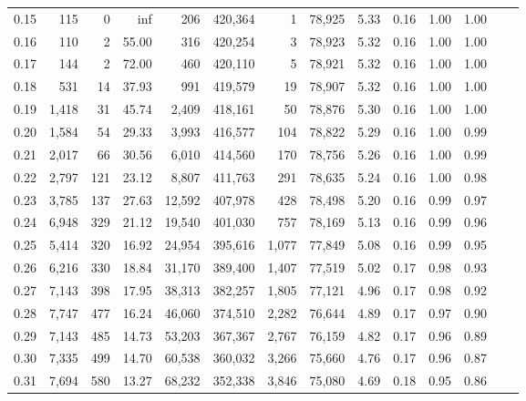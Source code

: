 \begin{tabular}{rrrrrrrrrrrrrr}
0.15 &     115 &      0 &     inf &      206 &  420,364 &       1 &  78,925 &  5.33 &  0.16 &  1.00 &      1.00 \\
0.16 &     110 &      2 &   55.00 &      316 &  420,254 &       3 &  78,923 &  5.32 &  0.16 &  1.00 &      1.00 \\
0.17 &     144 &      2 &   72.00 &      460 &  420,110 &       5 &  78,921 &  5.32 &  0.16 &  1.00 &      1.00 \\
0.18 &     531 &     14 &   37.93 &      991 &  419,579 &      19 &  78,907 &  5.32 &  0.16 &  1.00 &      1.00 \\
0.19 &   1,418 &     31 &   45.74 &    2,409 &  418,161 &      50 &  78,876 &  5.30 &  0.16 &  1.00 &      1.00 \\
0.20 &   1,584 &     54 &   29.33 &    3,993 &  416,577 &     104 &  78,822 &  5.29 &  0.16 &  1.00 &      0.99 \\
0.21 &   2,017 &     66 &   30.56 &    6,010 &  414,560 &     170 &  78,756 &  5.26 &  0.16 &  1.00 &      0.99 \\
0.22 &   2,797 &    121 &   23.12 &    8,807 &  411,763 &     291 &  78,635 &  5.24 &  0.16 &  1.00 &      0.98 \\
0.23 &   3,785 &    137 &   27.63 &   12,592 &  407,978 &     428 &  78,498 &  5.20 &  0.16 &  0.99 &      0.97 \\
0.24 &   6,948 &    329 &   21.12 &   19,540 &  401,030 &     757 &  78,169 &  5.13 &  0.16 &  0.99 &      0.96 \\
0.25 &   5,414 &    320 &   16.92 &   24,954 &  395,616 &   1,077 &  77,849 &  5.08 &  0.16 &  0.99 &      0.95 \\
0.26 &   6,216 &    330 &   18.84 &   31,170 &  389,400 &   1,407 &  77,519 &  5.02 &  0.17 &  0.98 &      0.93 \\
0.27 &   7,143 &    398 &   17.95 &   38,313 &  382,257 &   1,805 &  77,121 &  4.96 &  0.17 &  0.98 &      0.92 \\
0.28 &   7,747 &    477 &   16.24 &   46,060 &  374,510 &   2,282 &  76,644 &  4.89 &  0.17 &  0.97 &      0.90 \\
0.29 &   7,143 &    485 &   14.73 &   53,203 &  367,367 &   2,767 &  76,159 &  4.82 &  0.17 &  0.96 &      0.89 \\
0.30 &   7,335 &    499 &   14.70 &   60,538 &  360,032 &   3,266 &  75,660 &  4.76 &  0.17 &  0.96 &      0.87 \\
0.31 &   7,694 &    580 &   13.27 &   68,232 &  352,338 &   3,846 &  75,080 &  4.69 &  0.18 &  0.95 &      0.86 \\

\end{tabular}
